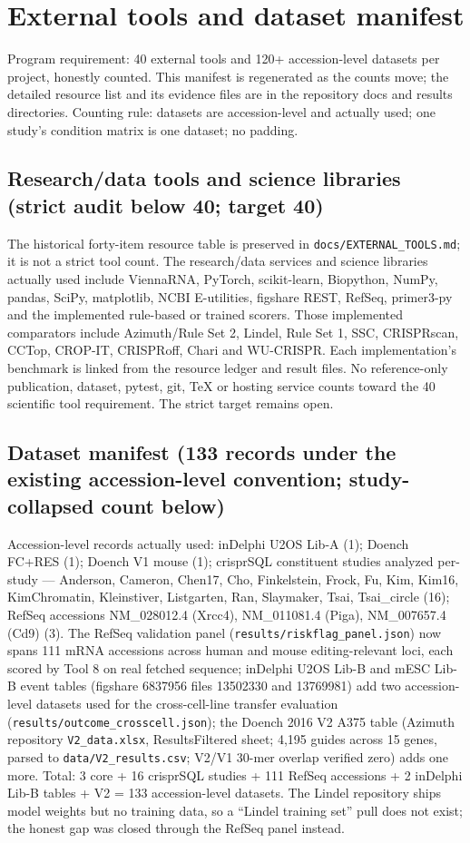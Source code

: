 \section{External tools and dataset manifest}
Program requirement: 40 external tools and 120+ accession-level datasets per
project, honestly counted. This manifest is regenerated as the counts move;
the detailed resource list and its evidence files are in the repository docs and results directories. Counting rule: datasets are accession-level and actually
used; one study's condition matrix is one dataset; no padding.

\subsection{Research/data tools and science libraries (strict audit below 40; target 40)}
The historical forty-item resource table is preserved in \texttt{docs/EXTERNAL\_TOOLS.md}; it is not a strict tool count. The research/data services and science libraries actually used include ViennaRNA, PyTorch, scikit-learn, Biopython, NumPy, pandas, SciPy, matplotlib, NCBI E-utilities, figshare REST, RefSeq, primer3-py and the implemented rule-based or trained scorers. Those implemented comparators include Azimuth/Rule Set 2, Lindel, Rule Set 1, SSC, CRISPRscan, CCTop, CROP-IT, CRISPRoff, Chari and WU-CRISPR. Each implementation's benchmark is linked from the resource ledger and result files. No reference-only publication, dataset, pytest, git, TeX or hosting service counts toward the 40 scientific tool requirement. The strict target remains open.

\subsection{Dataset manifest (133 records under the existing accession-level convention; study-collapsed count below)}
Accession-level records actually used: inDelphi U2OS Lib-A (1); Doench
FC+RES (1); Doench V1 mouse (1); crisprSQL constituent studies analyzed
per-study --- Anderson, Cameron, Chen17, Cho, Finkelstein, Frock, Fu, Kim,
Kim16, KimChromatin, Kleinstiver, Listgarten, Ran, Slaymaker, Tsai,
Tsai\_circle (16); RefSeq accessions NM\_028012.4 (Xrcc4), NM\_011081.4
(Piga), NM\_007657.4 (Cd9) (3). The RefSeq validation panel
(\texttt{results/riskflag\_panel.json}) now spans 111 mRNA accessions
across human and mouse editing-relevant loci, each scored by Tool 8 on real
fetched sequence; inDelphi U2OS Lib-B and mESC Lib-B event tables (figshare
6837956 files 13502330 and 13769981) add two accession-level datasets used
for the cross-cell-line transfer evaluation
(\texttt{results/outcome\_crosscell.json}); the Doench 2016 V2 A375 table
(Azimuth repository \texttt{V2\_data.xlsx}, ResultsFiltered sheet; 4{,}195
guides across 15 genes, parsed to \texttt{data/V2\_results.csv}; V2/V1
30-mer overlap verified zero) adds one more. Total: 3 core + 16 crisprSQL
studies + 111 RefSeq accessions + 2 inDelphi Lib-B tables + V2 = 133
accession-level datasets. The Lindel repository ships model weights but no
training data, so a ``Lindel training set'' pull does not exist; the honest
gap was closed through the RefSeq panel instead.

